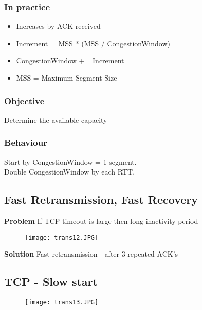 \documentclass[../resumosRCOM.tex]{subfiles}
\begin{document}
\subsubsection{In practice}
\begin{itemize}
    \item Increases by ACK received
    \item Increment = MSS * (MSS / CongestionWindow)
    \item CongestionWindow += Increment
    \item MSS = Maximum Segment Size
\end{itemize}

\subsubsection{Objective}
Determine the available capacity

\subsubsection{Behaviour}
Start by CongestionWindow = 1 segment. \\
Double CongestionWindow by each RTT.\\

\subsection{Fast Retransmission, Fast Recovery}
\textbf{Problem}
If TCP timeout is large then long inactivity period
\begin{figure}[h]
    \centering
    \texttt{[image: trans12.JPG]}
\end{figure}

\textbf{Solution}
Fast retransmission - after 3 repeated ACK's

\subsection{TCP - Slow start}
\begin{figure}[h]
    \centering
    \texttt{[image: trans13.JPG]}
\end{figure}
\end{document}

